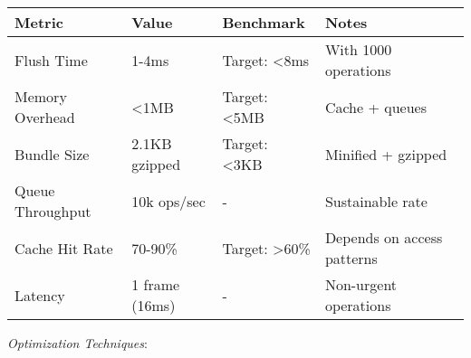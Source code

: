 \documentclass[11pt]{article}
\begin{document}
\begin{center}
\begin{tabular}{llll}
Metric & Value & Benchmark & Notes\\
\hline
Flush Time & 1-4ms & Target: <8ms & With 1000 operations\\
Memory Overhead & <1MB & Target: <5MB & Cache + queues\\
Bundle Size & 2.1KB gzipped & Target: <3KB & Minified + gzipped\\
Queue Throughput & 10k ops/sec & - & Sustainable rate\\
Cache Hit Rate & 70-90\% & Target: >60\% & Depends on access patterns\\
Latency & 1 frame (16ms) & - & Non-urgent operations\\
\end{tabular}
\end{center}

\emph{Optimization Techniques}:
\end{document}
